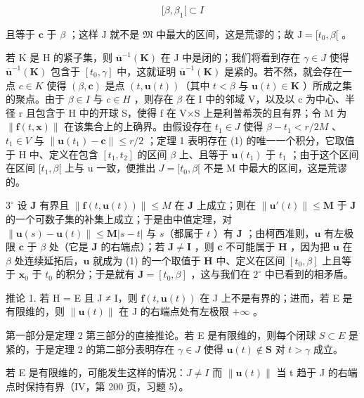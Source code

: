 \[
[ \beta , \beta_ {1} [ \subset I
\]

且等于 \(\mathbf{c}\) 于 \(\beta\) ；这样 \(\mathrm{J}\) 就不是 \(\mathfrak{M}\) 中最大的区间，这是荒谬的；故 \(\mathrm{J} = [t_0, \beta[\) 。

若 K 是 H 的紧子集，则 \(\overline{\mathbf{u}}^{-1}(\mathbf{K})\) 在 J 中是闭的；我们将看到存在 \(\gamma\in J\) 使得 \(\overline{\mathbf{u}}^{-1}(\mathbf{K})\) 包含于 \([t_{0},\gamma]\) 中，这就证明 \(\overline{\mathbf{u}}^{-1}(\mathbf{K})\) 是紧的。若不然，就会存在一点 \(c\in K\) 使得 \((\beta,\mathbf{c})\) 是点 \((t,\mathbf{u}(t))\)（其中 \(t<\beta\) 与 \(\mathbf{u}(t)\in\mathbf{K}\) ）所成之集的聚点。由于 \(\beta\in I\) 与 \(c\in H\) ，则存在 \(\beta\) 在 I 中的邻域 V，以及以 c 为中心、半径 r 且包含于 H 中的开球 S，使得 f 在 V×S 上是利普希茨的且有界；令 M 为 \(\|\mathbf{f}(t,\mathbf{x})\|\) 在该集合上的上确界。由假设存在 \(t_{1}\in J\) 使得 \(\beta-t_{1}<r/2M\) 、\(t_{1}\in V\) 与 \(\|\mathbf{u}(t_{1})-\mathbf{c}\|\leqslant r/2\) ；定理 1 表明存在 (1) 的唯一一个积分，它取值于 H 中、定义在包含 \([t_{1},t_{2}]\) 的区间 \(\beta\) 上、且等于 \(\mathbf{u}(t_{1})\) 于 \(t_{1}\) ；由于这个区间在区间 \([t_{1},\beta[\) 上与 u 一致，便推出 \(J=[t_{0},\beta[\) 不是 M 中最大的区间，这是荒谬的。

\(3^{\circ}\) 设 \(\mathbf{J}\) 有界且 \(\| \mathbf{f}(t,\mathbf{u}(t))\| \leqslant M\) 在 \(\mathbf{J}\) 上成立；则在 \(\| \mathbf{u}'(t)\| \leqslant \mathbf{M}\) 于 \(\mathbf{J}\) 的一个可数子集的补集上成立；于是由中值定理，对 \(\| \mathbf{u}(s) - \mathbf{u}(t)\| \leqslant \mathbf{M} |s - t|\) 与 \(s\)（都属于 \(t\) ）有 \(\mathbf{J}\) ；由柯西准则，\(\mathbf{u}\) 有左极限 \(\mathbf{c}\) 于 \(\beta\) 处（它是 \(\mathbf{J}\) 的右端点）；若 \(\mathbf{J} \neq \mathbf{I}\) ，则 \(\mathbf{c}\) 不可能属于 \(\mathbf{H}\) ，因为把 \(\mathbf{u}\) 在 \(\beta\) 处连续延拓后，\(\mathbf{u}\) 就成为 (1) 的一个取值于 \(\mathbf{H}\) 中、定义在区间 \([t_0, \beta]\) 上且等于 \(\mathbf{x}_0\) 于 \(t_0\) 的积分；于是就有 \(\mathbf{J} = [t_0, \beta]\) ，这与我们在 \(2^{\circ}\) 中已看到的相矛盾。

推论 1. 若 H = E 且 J ≠ I，则 \(\mathbf{f}(t, \mathbf{u}(t))\) 在 J 上不是有界的；进而，若 E 是有限维的，则 \(\| \mathbf{u}(t) \|\) 在 J 的右端点处有左极限 \(+\infty\) 。

第一部分是定理 2 第三部分的直接推论。若 E 是有限维的，则每个闭球 \(S \subset E\) 是紧的，于是定理 2 的第二部分表明存在 \(\gamma \in J\) 使得 \(\mathbf{u}(t) \notin \mathbf{S}\) 对 \(t > \gamma\) 成立。

若 E 是有限维的，可能发生这样的情况：\(J \neq I\) 而 \(\|\mathbf{u}(t)\|\) 当 t 趋于 J 的右端点时保持有界（IV，第 200 页，习题 5）。

